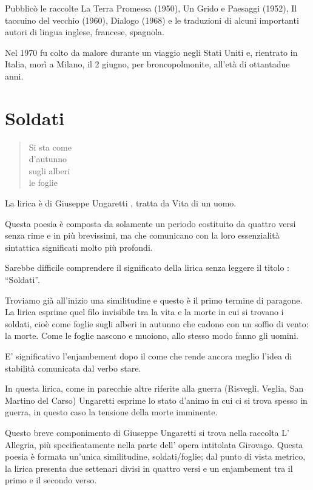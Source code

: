 Pubblicò le raccolte La Terra Promessa (1950), Un Grido e Paesaggi (1952), Il taccuino del vecchio (1960), Dialogo (1968) e le traduzioni di alcuni importanti autori di lingua inglese, francese, spagnola.

Nel 1970 fu colto da malore durante un viaggio negli Stati Uniti e, rientrato in Italia, morì a Milano, il 2 giugno, per broncopolmonite, all’età di ottantadue anni.

\section{Soldati}

\begin{verse}
  Si sta come \\
  d'autunno \\
  sugli alberi \\
  le foglie
\end{verse}

La lirica è di Giuseppe Ungaretti , tratta da Vita di un uomo.

Questa poesia è composta da solamente un periodo costituito da quattro versi senza rime e in più brevissimi, ma che comunicano con la loro essenzialità sintattica significati molto più profondi.

Sarebbe difficile comprendere il significato della lirica senza leggere il titolo : “Soldati”.

Troviamo già all’inizio una similitudine e questo è il primo termine di paragone. La lirica esprime quel filo invisibile tra la vita e la morte in cui si trovano i soldati, cioè come foglie sugli alberi in autunno che cadono con un soffio di vento: la morte. Come le foglie nascono e muoiono, allo stesso modo fanno gli uomini.

E’ significativo l’enjambement dopo il come che rende ancora meglio l’idea di stabilità comunicata dal verbo stare.

In questa lirica, come in parecchie altre riferite alla guerra (Risvegli, Veglia, San Martino del Carso) Ungaretti esprime lo stato d’animo in cui ci si trova spesso in guerra, in questo caso la tensione della morte imminente.

Questo breve componimento di Giuseppe Ungaretti  si trova nella raccolta L’ Allegria, più specificatamente nella parte dell’ opera intitolata Girovago. Questa poesia è formata un’unica similitudine, soldati/foglie; dal punto di vista metrico, la lirica presenta due settenari divisi in quattro versi e un enjambement tra il primo e il secondo verso.

